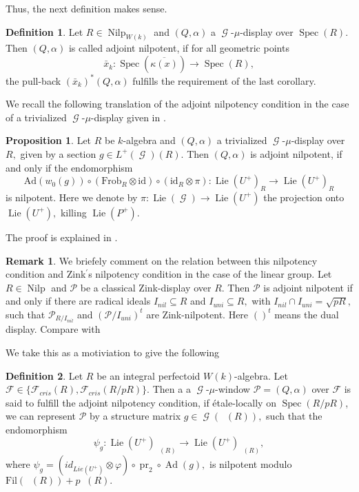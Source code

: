 \documentclass[a4paper,10,5 pt]{amsart}
\theoremstyle{definition}
\newtheorem{Definition}{Definition}
\newtheorem{Remark}{Remark}
\newtheorem{proposition}[Satz]{Proposition}
\DeclareMathOperator{\Lie}{Lie}
\DeclareMathOperator{\Spec}{Spec}
\DeclareMathOperator{\Nilp}{Nilp}
\DeclareMathOperator{\Acris}{\mathbb{A}_{cris}}
\DeclareMathOperator{\Ad}{Ad}
\DeclareMathOperator{\G}{\mathcal{G}}
\DeclareMathOperator{\pr}{pr}
\begin{document}
Thus, the next definition makes sense.
\begin{Definition}
Let $R\in \Nilp_{W(k)}$ and $(Q,\alpha)$ a $\G$-$\mu$-display over $\Spec(R).$ Then $(Q,\alpha)$ is called adjoint nilpotent, if for all geometric points
$$
\bar{x}_{k}\colon \Spec(\overline{\kappa(x)})\rightarrow \Spec(R),
$$
the pull-back $(\bar{x}_{k})^{*}(Q,\alpha)$ fulfills the requirement of the last corollary.
\end{Definition}
We recall the following translation of the adjoint nilpotency condition in the case of a trivialized $\G$-$\mu$-display given in \cite{BP}.
\begin{proposition}
Let $R$ be $k$-algebra and $(Q,\alpha)$ a trivialized $\G$-$\mu$-display over $R,$ given by a section $g\in L^{+}(\G)(R).$ Then $(Q,\alpha)$ is adjoint nilpotent, if and only if the endomorphism
$$
\text{Ad}(w_{0}(g))\circ (\text{Frob}_{R}\otimes \text{id}) \circ (\text{id}_{R}\otimes \pi)\colon \Lie(U^{+})_{R}\rightarrow \Lie(U^{+})_{R}
$$
is nilpotent. Here we denote by $\pi\colon \Lie(\G)\rightarrow \Lie(U^{+})$ the projection onto $\Lie(U^{+}),$ killing $\Lie(P^{+}).$
\end{proposition}
The proof is explained in \cite[3.4.4.]{BP}.
\begin{Remark}
We briefely comment on the relation between this nilpotency condition and Zink$^{\prime}$s nilpotency condition in the case of the linear group. Let $R\in \Nilp$ and $\mathcal{P}$ be a classical Zink-display over $R.$ Then $\mathcal{P}$ is adjoint nilpotent if and only if there are radical ideals $I_{nil}\subseteq R$ and $I_{uni}\subseteq R,$ with $I_{nil}\cap I_{uni}=\sqrt{pR},$ such that $\mathcal{P}_{R/I_{nil}}$ and $(\mathcal{P}/I_{uni})^{t}$ are Zink-nilpotent. Here $()^{t}$ means the dual display. Compare with 
\end{Remark}
We take this as a motiviation to give the following
\begin{Definition}
Let $R$ be an integral perfectoid $W(k)$-algebra. Let $\mathcal{F}\in \lbrace \mathcal{F}_{cris}(R),\mathcal{F}_{cris}(R/pR) \rbrace.$ Then a a $\G$-$\mu$-window $\mathcal{P}=(Q,\alpha)$ over $\mathcal{F}$ is said to fulfill the adjoint nilpotency condition, if étale-locally on $\Spec(R/pR)$, we can represent $\mathcal{P}$ by a structure matrix $g\in\G(\Acris(R)),$ such that the endomorphism
$$
\psi_{g}\colon \Lie(U^{+})_{\Acris(R)}\rightarrow \Lie(U^{+})_{\Acris(R)},
$$
where $\psi_{g}=(id_{Lie(U^{+})}\otimes\varphi)\circ \pr_{2} \circ \Ad(g),$ is nilpotent modulo $\text{Fil}(\Acris(R))+p\Acris(R).$
\end{Definition}
\end{document}
